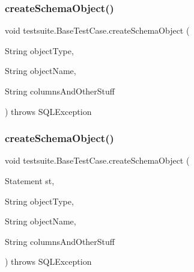 \subsubsection{\texorpdfstring{create\+Schema\+Object()}{createSchemaObject()}\hspace{0.1cm}{\footnotesize\ttfamily [1/2]}}
{\footnotesize\ttfamily void testsuite.\+Base\+Test\+Case.\+create\+Schema\+Object (\begin{DoxyParamCaption}\item[{String}]{object\+Type,  }\item[{String}]{object\+Name,  }\item[{String}]{columns\+And\+Other\+Stuff }\end{DoxyParamCaption}) throws S\+Q\+L\+Exception\hspace{0.3cm}{\ttfamily [protected]}}

\mbox{\label{classtestsuite_1_1_base_test_case_a7c9a8512d5ed0cfbe4b80a8f1b990b24}} 
\subsubsection{\texorpdfstring{create\+Schema\+Object()}{createSchemaObject()}\hspace{0.1cm}{\footnotesize\ttfamily [2/2]}}
{\footnotesize\ttfamily void testsuite.\+Base\+Test\+Case.\+create\+Schema\+Object (\begin{DoxyParamCaption}\item[{Statement}]{st,  }\item[{String}]{object\+Type,  }\item[{String}]{object\+Name,  }\item[{String}]{columns\+And\+Other\+Stuff }\end{DoxyParamCaption}) throws S\+Q\+L\+Exception\hspace{0.3cm}{\ttfamily [protected]}}

\mbox{\label{classtestsuite_1_1_base_test_case_a9b100bed1696694cdede1b8181bdf70a}} 
